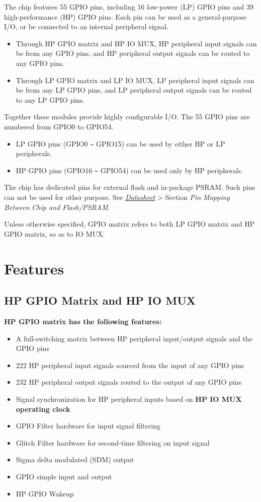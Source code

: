 \documentclass[main\_\_EN.tex]{subfiles}
\begin{document}
The \chipname{} chip features 55 GPIO pins, including 16 low-power (LP) GPIO pins and 39 high-performance (HP) GPIO pins. Each pin can be used as a general-purpose I/O, or be connected to an internal peripheral signal.
\begin{itemize}
\item Through HP GPIO matrix and HP IO MUX, HP peripheral input signals can be from any GPIO pins, and HP peripheral output signals can be routed to any GPIO pins.
\item Through LP GPIO matrix and LP IO MUX, LP peripheral input signals can be from any LP GPIO pins, and LP peripheral output signals can be routed to any LP GPIO pins.

\end{itemize}
Together these modules provide highly configurable I/O. The 55 GPIO pins are numbered from GPIO0 to GPIO54.
    \begin{itemize}
        \item LP GPIO pins (GPIO0 \verb+~+ GPIO15) can be used by either HP or LP peripherals.
        \item HP GPIO pins (GPIO16 \verb+~+ GPIO54) can be used only by HP peripherals.
    \end{itemize}
The \chipname{} chip has dedicated pins for external flash and in-package PSRAM. Such pins can not be used for other purpose. See {\textit{\href{https://www.espressif.com/sites/default/files/documentation/esp32-p4_datasheet_en.pdf}{\chipname{} Datasheet}}} > Section \textit{Pin Mapping Between Chip and Flash/PSRAM}.

Unless otherwise specified, GPIO matrix refers to both LP GPIO matrix and HP GPIO matrix, so as to IO MUX.

\section{Features}
\subsection{HP GPIO Matrix and HP IO MUX}
\textbf{HP GPIO matrix has the following features:}

\begin{itemize}
\item A full-switching matrix between HP peripheral input/output signals and the GPIO pins
\item 222 HP peripheral input signals sourced from the input of any GPIO pins
\item 232 HP peripheral output signals routed to the output of any GPIO pins
\item Signal synchronization for HP peripheral inputs based on \textbf{HP IO MUX operating clock}
\item GPIO Filter hardware for input signal filtering
\item Glitch Filter hardware for second-time filtering on input signal
\item Sigma delta modulated (SDM) output
\item GPIO simple input and output
\item HP GPIO Wakeup
\end{itemize}
\end{document}

